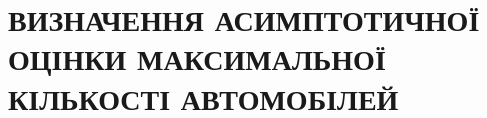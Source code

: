 \chapter{ВИЗНАЧЕННЯ АСИМПТОТИЧНОЇ ОЦІНКИ МАКСИМАЛЬНОЇ КІЛЬКОСТІ АВТОМОБІЛЕЙ} 
\label{chapter:asymptotics}


